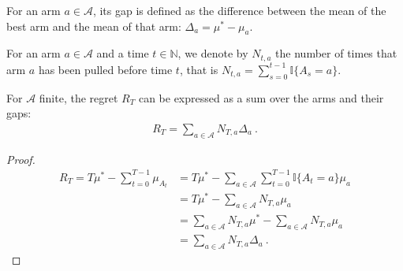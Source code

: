 \begin{definition}\label{def:gap}
  \leanok
For an arm $a \in \mathcal{A}$, its gap is defined as the difference between the mean of the best arm and the mean of that arm: $\Delta_a = \mu^* - \mu_a$.
\end{definition}


\begin{definition}\label{def:pullCount}
  \leanok
For an arm $a \in \mathcal{A}$ and a time $t \in \mathbb{N}$, we denote by $N_{t,a}$ the number of times that arm $a$ has been pulled before time $t$, that is $N_{t,a} = \sum_{s=0}^{t-1} \mathbb{I}\{A_s = a\}$.
\end{definition}


\begin{lemma}\label{lem:regret_eq_sum_pullCount_mul_gap}
  \leanok
For $\mathcal{A}$ finite, the regret $R_T$ can be expressed as a sum over the arms and their gaps:
\begin{align*}
  R_T = \sum_{a \in \mathcal{A}} N_{T,a} \Delta_a \: .
\end{align*}
\end{lemma}

\begin{proof}
  \leanok
\begin{align*}
  R_T = T \mu^* - \sum_{t=0}^{T-1} \mu_{A_t}
  &= T \mu^* - \sum_{a \in \mathcal{A}} \sum_{t=0}^{T-1} \mathbb{I}\{A_t = a\} \mu_a
  \\
  &= T \mu^* - \sum_{a \in \mathcal{A}} N_{T,a} \mu_a
  \\
  &= \sum_{a \in \mathcal{A}} N_{T,a} \mu^* - \sum_{a \in \mathcal{A}} N_{T,a} \mu_a
  \\
  &= \sum_{a \in \mathcal{A}} N_{T,a} \Delta_a
  \: .
\end{align*}
\end{proof}
